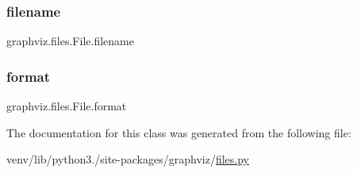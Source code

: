 \subsubsection{\texorpdfstring{filename}{filename}}
{\footnotesize\ttfamily graphviz.\+files.\+File.\+filename}

\mbox{\label{classgraphviz_1_1files_1_1File_acd2dce8967c8ff4c00ad6c47872dc340}} 
\subsubsection{\texorpdfstring{format}{format}}
{\footnotesize\ttfamily graphviz.\+files.\+File.\+format}



The documentation for this class was generated from the following file\+:\begin{DoxyCompactItemize}
\item 
venv/lib/python3./site-\/packages/graphviz/\hyperlink{files_8py}{files.\+py}\end{DoxyCompactItemize}
